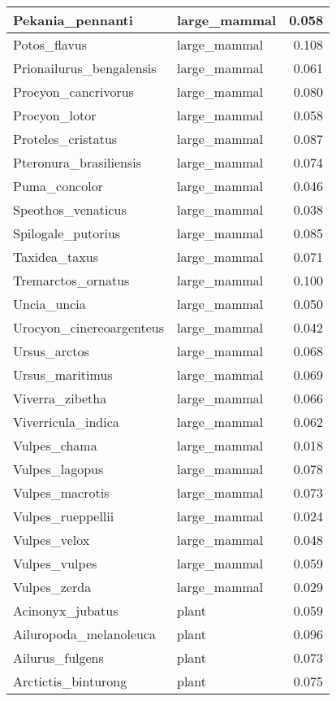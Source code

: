 \begin{table}
\begin{tabular}[t]{l|l|r}
\hline
Pekania\_pennanti & large\_mammal & 0.058\\
\hline
Potos\_flavus & large\_mammal & 0.108\\
\hline
Prionailurus\_bengalensis & large\_mammal & 0.061\\
\hline
Procyon\_cancrivorus & large\_mammal & 0.080\\
\hline
Procyon\_lotor & large\_mammal & 0.058\\
\hline
Proteles\_cristatus & large\_mammal & 0.087\\
\hline
Pteronura\_brasiliensis & large\_mammal & 0.074\\
\hline
Puma\_concolor & large\_mammal & 0.046\\
\hline
Speothos\_venaticus & large\_mammal & 0.038\\
\hline
Spilogale\_putorius & large\_mammal & 0.085\\
\hline
Taxidea\_taxus & large\_mammal & 0.071\\
\hline
Tremarctos\_ornatus & large\_mammal & 0.100\\
\hline
Uncia\_uncia & large\_mammal & 0.050\\
\hline
Urocyon\_cinereoargenteus & large\_mammal & 0.042\\
\hline
Ursus\_arctos & large\_mammal & 0.068\\
\hline
Ursus\_maritimus & large\_mammal & 0.069\\
\hline
Viverra\_zibetha & large\_mammal & 0.066\\
\hline
Viverricula\_indica & large\_mammal & 0.062\\
\hline
Vulpes\_chama & large\_mammal & 0.018\\
\hline
Vulpes\_lagopus & large\_mammal & 0.078\\
\hline
Vulpes\_macrotis & large\_mammal & 0.073\\
\hline
Vulpes\_rueppellii & large\_mammal & 0.024\\
\hline
Vulpes\_velox & large\_mammal & 0.048\\
\hline
Vulpes\_vulpes & large\_mammal & 0.059\\
\hline
Vulpes\_zerda & large\_mammal & 0.029\\
\hline
Acinonyx\_jubatus & plant & 0.059\\
\hline
Ailuropoda\_melanoleuca & plant & 0.096\\
\hline
Ailurus\_fulgens & plant & 0.073\\
\hline
Arctictis\_binturong & plant & 0.075\\

\end{tabular}
\end{table}
